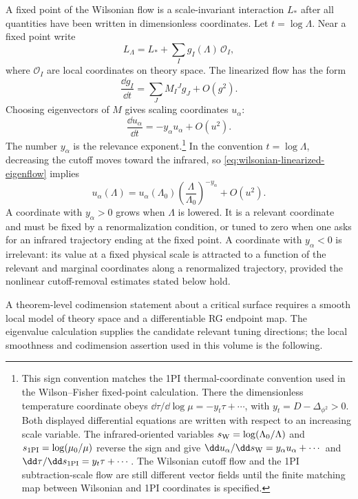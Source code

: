 A fixed point of the Wilsonian flow is a scale-invariant interaction
\(L_*\) after all quantities have been written in dimensionless coordinates.
Let \(t=\log\Lambda\).  Near a fixed point write
\[
  L_\Lambda=L_*+\sum_I g_I(\Lambda)\,\mathcal O_I ,
\]
where \(\mathcal O_I\) are local coordinates on theory space.  The linearized
flow has the form
\[
  \frac{\dd g_I}{\dd t}
  =
  \sum_J M_I{}^J g_J+O(g^2).
\]
Choosing eigenvectors of \(M\) gives scaling coordinates \(u_\alpha\):
\begin{equation}
  \frac{\dd u_\alpha}{\dd t}
  =
  -y_\alpha u_\alpha+O(u^2).
  \label{eq:wilsonian-linearized-eigenflow}
\end{equation}
The number \(y_\alpha\) is the relevance exponent.\footnote{This sign
convention matches the 1PI thermal-coordinate convention used in the
Wilson--Fisher fixed-point calculation.  There the dimensionless temperature
coordinate obeys
\(\dd\tau/\dd\log\mu=-y_t\tau+\cdots\), with
\(y_t=D-\Delta_{\phi^2}>0\).  Both displayed differential equations are written
with respect to an increasing scale variable.  The infrared-oriented variables
\(s_{\rm W}=\log(\Lambda_0/\Lambda)\) and
\(s_{\rm 1PI}=\log(\mu_0/\mu)\) reverse the sign and give
\(\dd u_\alpha/\dd s_{\rm W}=y_\alpha u_\alpha+\cdots\) and
\(\dd\tau/\dd s_{\rm 1PI}=y_t\tau+\cdots\).  The Wilsonian cutoff flow and the
1PI subtraction-scale flow are still different vector fields until the finite
matching map between Wilsonian and 1PI coordinates is specified.}
In the convention \(t=\log\Lambda\), decreasing the cutoff moves toward the
infrared, so \eqref{eq:wilsonian-linearized-eigenflow} implies
\[
  u_\alpha(\Lambda)
  =
  u_\alpha(\Lambda_0)
  \left(\frac{\Lambda}{\Lambda_0}\right)^{-y_\alpha}
  +O(u^2).
\]
A coordinate with \(y_\alpha>0\) grows when \(\Lambda\) is lowered.  It is a
relevant coordinate and must be fixed by a renormalization condition, or
tuned to zero when one asks for an infrared trajectory ending at the fixed
point.  A coordinate with \(y_\alpha<0\) is irrelevant: its value at a fixed
physical scale is attracted to a function of the relevant and marginal
coordinates along a renormalized trajectory, provided the nonlinear
cutoff-removal estimates stated below hold.

A theorem-level codimension statement about a critical surface requires a
smooth local model of theory space and a differentiable RG endpoint map.  The
eigenvalue calculation supplies the candidate relevant tuning directions; the
local smoothness and codimension assertion used in this volume is the
following.

